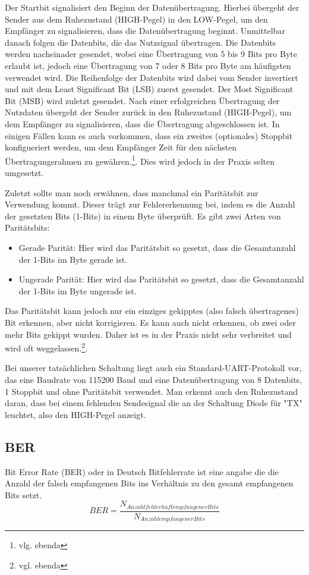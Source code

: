 Der Startbit signalisiert den Beginn der Datenübertragung. Hierbei übergeht der Sender aus dem Ruhezustand (HIGH-Pegel) in den LOW-Pegel, um den Empfänger zu signalisieren, dass die Datenübertragung beginnt. 
Unmittelbar danach folgen die Datenbits, die das Nutzsignal übertragen. Die Datenbits werden nacheinader gesendet, wobei eine Übertragung von 5 bis 9 Bits pro Byte erlaubt ist, jedoch eine Übertragung von 7 oder 8 Bits pro Byte am häufigsten verwendet wird. Die Reihenfolge der Datenbits wird dabei vom Sender invertiert und mit dem Least Significant Bit (LSB) zuerst gesendet. Der Most Significant Bit (MSB) wird zuletzt gesendet.
Nach einer erfolgreichen Übertragung der Nutzdaten übergeht der Sender zurück in den Ruhezustand (HIGH-Pegel), um dem Empfänger zu signalisieren, dass die Übertragung abgeschlossen ist.
In einigen Fällen kann es auch vorkommen, dass ein zweites (optionales) Stoppbit konfigueriert werden, um dem Empfänger Zeit für den nächsten Übertragungsrahmen zu gewähren.\footnote{vlg. ebenda}. Dies wird jedoch in der Praxis selten umgesetzt. 

Zuletzt sollte man noch erwähnen, dass manchmal ein Paritätsbit zur Verwendung kommt. Dieser trägt zur Fehlererkennung bei, indem es die Anzahl der gesetzten Bits (1-Bits) in einem Byte überprüft. Es gibt zwei Arten von Paritätsbits: 
\begin{itemize}
    \item Gerade Parität: Hier wird das Paritätsbit so gesetzt, dass die Gesamtanzahl der 1-Bits im Byte gerade ist.
    \item Ungerade Parität: Hier wird das Paritätsbit so gesetzt, dass die Gesamtanzahl der 1-Bits im Byte ungerade ist.
\end{itemize}

Das Paritätsbit kann jedoch nur ein einziges gekipptes (also falsch übertragenes) Bit erkennen, aber nicht korrigieren. Es kann auch nicht erkennen, ob zwei oder mehr Bits gekippt wurden. Daher ist es in der Praxis nicht sehr verbreitet und wird oft weggelassen.\footnote{vgl. ebenda}.

Bei unserer tatsächlichen Schaltung liegt auch ein Standard-UART-Protokoll vor, das eine Baudrate von 115200 Baud und eine Datenübertragung von 8 Datenbits, 1 Stoppbit und ohne Paritätsbit verwendet. Man erkennt auch den Ruhezustand daran, dass bei einem fehlenden Sendesignal die an der Schaltung Diode für "TX" leuchtet, also den HIGH-Pegel anzeigt.
\subsection{BER}
Bit Error Rate (BER) oder in Deutsch Bitfehlerrate ist eine angabe die die
Anzahl der falsch empfangenen Bits ins Verhältnis zu den gesamt empfangenen Bits setzt.
\begin{equation}
    BER = \frac{N_{Anzahl fehlerhaft empfangener Bits}}{N_{Anzahl empfangener Bits}}
\end{equation}
